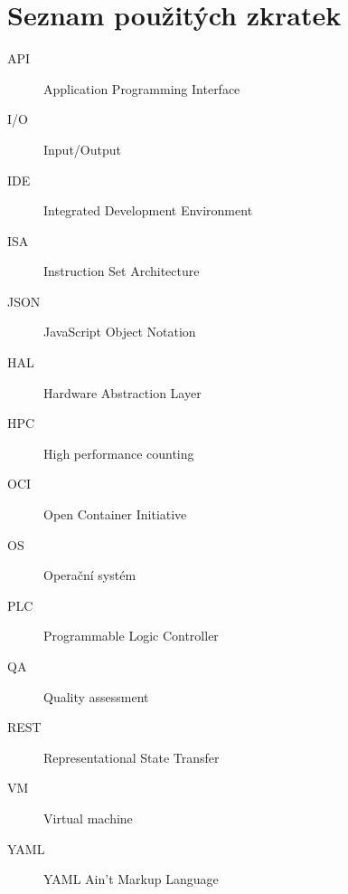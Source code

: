 \chapter{Seznam použitých zkratek}
\begin{description}
	\item[API] Application Programming Interface
	\item[I/O] Input/Output
	\item[IDE] Integrated Development Environment 
	\item[ISA] Instruction Set Architecture 
	\item[JSON] JavaScript Object Notation
	\item[HAL] Hardware Abstraction Layer
	\item[HPC] High performance counting
	\item[OCI] Open Container Initiative
	\item[OS] Operační systém 
	\item[PLC] Programmable Logic Controller
	\item[QA] Quality assessment 
	\item[REST] Representational State Transfer
	\item[VM] Virtual machine
	\item[YAML] YAML Ain't Markup Language
\end{description}
